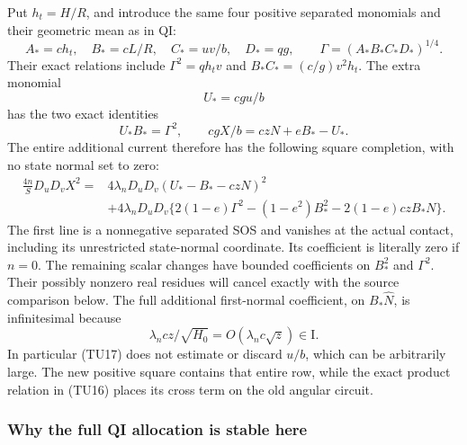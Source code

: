 Put $h_t=H/R$, and introduce the same four positive separated
monomials and their geometric mean as in QI:
\[
 A_*=ch_t,\quad B_*=cL/R,\quad C_*=uv/b,\quad
 D_*=qg,\qquad \Gamma=(A_*B_*C_*D_*)^{1/4}.
                                                               \tag{TU15}
\]
Their exact relations include
$\Gamma^2=qh_tv$ and $B_*C_*=(c/g)v^2h_t$.
The extra monomial
\[
                   U_*=cgu/b
\]
has the two exact identities
\[
       U_*B_*=\Gamma^2,\qquad
       cgX/b=czN+eB_*-U_*.
                                                               \tag{TU16}
\]
The entire additional current therefore has the following square
completion, with no state normal set to zero:
\begin{align*}
 \frac{4n}{S}D_uD_vX^2
 ={}&4\lambda_nD_uD_v(U_*-B_*-czN)^2\\
 &+4\lambda_nD_uD_v
   \{2(1-e)\Gamma^2-(1-e^2)B_*^2
                         -2(1-e)czB_*N\}.
                                                               \tag{TU17}
\end{align*}
The first line is a nonnegative separated SOS and vanishes at the
actual contact, including its unrestricted state-normal coordinate.
Its coefficient is literally zero if $n=0$.  The remaining scalar
changes have bounded coefficients on $B_*^2$ and $\Gamma^2$.
Their possibly nonzero real residues will cancel exactly with
the source comparison below.  The full additional first-normal coefficient, on
$B_*\widehat N$, is infinitesimal because
\[
       \lambda_n cz/\sqrt{H_0}=O(\lambda_n c\sqrt z)
                                            \in\mathrm I.
                                                               \tag{TU18}
\]
In particular (TU17) does not estimate or discard $u/b$, which can
be arbitrarily large.  The new positive square contains that entire
row, while the exact product relation in (TU16) places its cross
term on the old angular circuit.

\subsubsection*{Why the full QI allocation is stable here}

